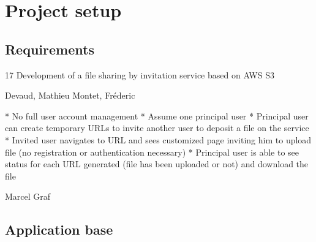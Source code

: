 \chapter{Project setup}

\section{Requirements}

17 Development of a file sharing by invitation service based on AWS S3

Devaud, Mathieu
Montet, Fréderic

* No full user account management
* Assume one principal user
* Principal user can create temporary URLs to invite another user to deposit a file on the service
* Invited user navigates to URL and sees customized page inviting him
 to upload file (no registration or authentication necessary)
 * Principal user is able to see status for each URL generated (file
  has been uploaded or not) and download the file


  Marcel Graf


 \section{Application base}
 